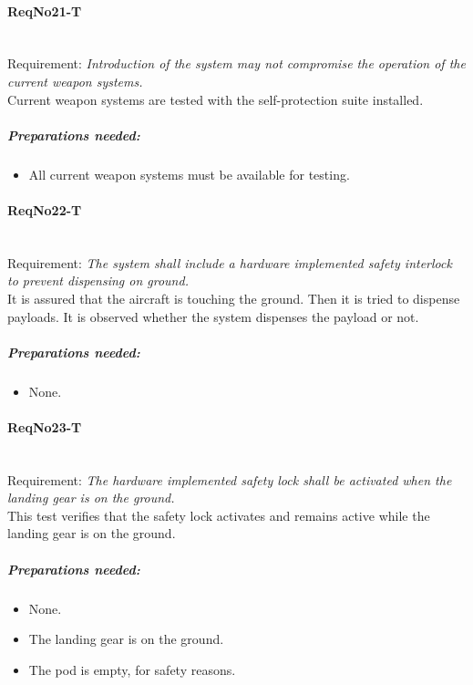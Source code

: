 \paragraph{ReqNo21-T}\mbox{}\\ %
Requirement: \textit{Introduction of the system may not compromise the operation of the current weapon systems.}
\\
Current weapon systems are tested with the self-protection suite installed.

	\subparagraph{Preparations needed:}
	\begin{itemize}
	\item All current weapon systems must be available for testing.
	\end{itemize} 
	

\paragraph{ReqNo22-T}\mbox{}\\ %
Requirement: \textit{The system shall include a hardware implemented safety interlock to prevent dispensing on ground.}
\\
It is assured that the aircraft is touching the ground. Then it is tried to dispense payloads. It is observed whether the system dispenses the payload or not.
\\
	\subparagraph{Preparations needed:}
	\begin{itemize}
	\item None.
	\end{itemize} 

\paragraph{ReqNo23-T}\mbox{}\\ %
Requirement: \textit{The hardware implemented safety lock shall be activated when the landing gear is on the ground.}
\\
This test verifies that the safety lock activates and remains active while the
landing gear is on the ground.
\\
	\subparagraph{Preparations needed:}
	\begin{itemize}
	\item None.
	\item The landing gear is on the ground.
	\item The pod is empty, for safety reasons.
	\end{itemize} 

